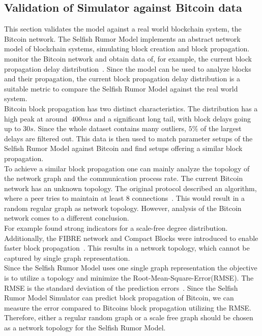 \subsection{Validation of Simulator against Bitcoin data}
This section validates the model against a real world blockchain system, the Bitcoin network. The Selfish Rumor Model implements an abstract network model of blockchain systems, simulating block creation and block propagation.
 monitor the Bitcoin network and obtain data of, for example, the current block propagation delay distribution~\cite{BitcoinNetworkMonitor}. Since the model can be used to analyze blocks and their propagation, the current block propagation delay distribution is a suitable metric to compare the Selfish Rumor Model against the real world system.\\
Bitcoin block propagation has two distinct characteristics. The distribution has a high peak at around $~400ms$ and a significant long tail, with block delays going up to $30s$. Since the whole dataset contains many outliers, $5\% $ of the largest delays are filtered out. This data is then used to match parameter setups of the Selfish Rumor Model against Bitcoin and find setups offering a similar block propagation.\\
To achieve a similar block propagation one can mainly analyze the topology of the network graph and the communication process rate.
The current Bitcoin network has an unknown topology. The original protocol described an algorithm, where a peer tries to maintain at least 8 connections~\cite{tschorsch}. This would result in a random regular graph as network topology. However, analysis of the Bitcoin network comes to a different conclusion.\\
For example  found strong indicators for a scale-free degree distribution.
Additionally, the FIBRE network and Compact Blocks were introduced to enable faster block propagation~\cite{measurement}. This results in a network topology, which cannot be captured by single graph representation.\\
Since the Selfish Rumor Model uses one single graph representation the objective is to utilize a topology and minimize the Root-Mean-Square-Error(RMSE). The RMSE is the standard deviation of the prediction errors~\cite{RMSE}. Since the Selfish Rumor Model Simulator can predict block propagation of Bitcoin, we can measure the error compared to Bitcoins block propagation utilizing the RMSE. Therefore, either a regular random graph or a scale free graph should be chosen as a network topology for the Selfish Rumor Model. 
